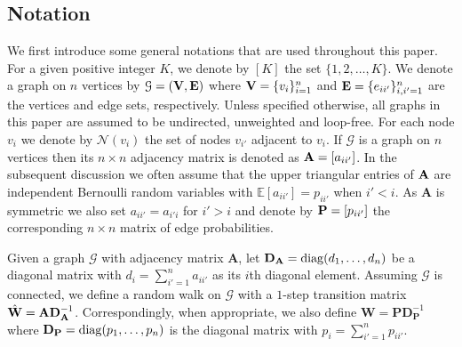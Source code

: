 \documentclass[10pt,journal,compsoc]{IEEEtran}
\newcommand{\RR}{\mathbb{R}}
\newcommand{\ee}{\end{aligned} \end{equation}}
\newcommand{\diag}{\mathrm{diag}}
\newcommand{\bds}{\boldsymbol}
\newcommand{\T}{\top}
\def\T{{ \mathrm{\scriptscriptstyle T} }} %
\newcommand{\bee}{\begin{equation}\begin{aligned}}
\newcommand{\M}[1]{{{\mathbf{\MakeUppercase{#1}}}}}
\numberwithin{equation}{section}
\begin{document}
 

\subsection{Notation}
We first introduce some general notations that are used 
throughout this paper. For a given positive integer $K$, we denote by
$[K]$ the set $\{1,2,\dots,K\}$. We denote a graph on $n$ vertices by $\mathcal{G} = (\M V, \M E)$ where $\M V =
\{v_i\}_{i = 1}^n$ and $\M E= \{e_{ii'}\}_{i,i' = 1}^n$ are the
vertices and edge sets, respectively. Unless specified otherwise, all graphs in this paper are
assumed to be undirected, unweighted and loop-free. For each node $v_i$ we denote
by $\mathcal{N}(v_i)$ the set of nodes $v_{i'}$ adjacent to $v_i$. %
If $\mathcal{G}$ is a graph on $n$ vertices then its $n \times n$ adjacency matrix is denoted
as $\M A = [a_{ii'}]$. In the subsequent discussion we
often assume that the upper triangular entries of $\M A$ are independent
Bernoulli random variables with $\mathbb{E}[a_{ii'}] = p_{ii'}$ when $i' < i$. As $\mathbf{A}$ is symmetric we also set $a_{ii'} = a_{i'i}$ for $i' > i$ and denote by
$\M P = [p_{ii'}]$ the corresponding $n \times n$ matrix of edge probabilities.

Given a graph $\mathcal{G}$ with adjacency matrix $\mathbf{A}$, let $\M D_{\M A} = \mathrm{diag}(d_1,\dots,d_n)$ be a diagonal matrix with $d_i
= \sum_{i' = 1}^{n}a_{ii'} $ as its $i$th diagonal element. Assuming $\mathcal{G}$ is connected, we define a
random walk on $\mathcal{G}$ with a $1$-step transition matrix $\hat{\M
  W} = \M A \M D_{\M A}^{-1}$. %
Correspondingly, when appropriate, we also define $\mathbf{W} =
\mathbf{P} \mathbf{D}_{\mathbf{P}}^{-1}$ where $\M D_{\M P}
= \diag(p_1,\dots,p_n)$ is the diagonal matrix with $p_i = \sum_{i' =
1}^{n}p_{ii'}$. %
\end{document}
